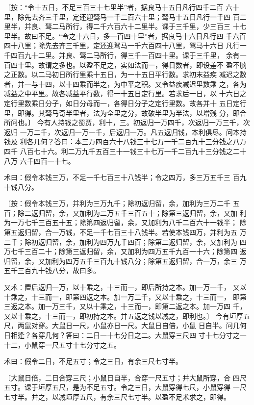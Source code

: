 \documentclass[a4paper,12pt,UTF8,twoside]{ctexbook}
\begin{document}
〔按：“令十五日，不足三百三十七里半”者，据良马十五日凡行四千二百 六十里，除先去齐三千里，定还迎驽马一千二百六十里；驽马十五日凡行一千四 百二里半，并良、驽二马所行，得二千六百六十二里半。课于三千里，少三百三 十七里半。故曰不足。“令之十六日，多一百四十里”者，据良马十六日凡行四 千六百四十八里；除先去齐三千里，定还迎驽马一千六百四十八里，驽马十六日 凡行一千四百九十二里。并良、驽二马所行，得三千一百四十里。课于三千里， 余有一百四十里。故谓之多也。以盈不足之，实如法而一，得日数者，即设差不 盈不朒之正数。以二马初日所行里乘十五日，为一十五日平行数。求初末益疾 减迟之数者，并一与十四，以十四乘而半之，为中平之积。又令益疾减迟里数乘 之，各为减益之中平里。故各减益平行数，得一十五日定行里。若求后一日，以 十六日之定行里数乘日分子，如日分母而一，各得日分子之定行里数。故各并十 五日定行里，即得。其驽马奇半里者，法为全里之分，故破半里为半法，以增残 分，即合所问也。〕 今有人持钱之蜀贾，利十，三。初返归一万四千，次返归一万三千，次返归 一万二千，次返归一万一千，后返归一万。凡五返归钱，本利俱尽。问本持钱及 利各几何？答曰：本三万四百六十八钱三十七万一千二百九十三分钱之八万四千 八百七十六。利二万九千五百三十一钱三十七万一千二百九十三分钱之二十八万 六千四百一十七。

术曰：假令本钱三万，不足一千七百三十八钱半；令之四万，多三万五千三 百九十钱八分。

〔按：假令本钱三万，并利为三万九千；除初返归留，余，加利为三万二千 五百；除二返归留，余，又加利为二万五千三百五十；除第三返归留，余，又加 利为一万七千三百五十五；除第四返归留，余，又加利为八千二百六十一钱半； 除第五返归留，合一万钱，不足一千七百三十八钱半。若使本钱四万，并利为五 万二千；除初返归留，余，加利为四万九千四百；除第二返归留，余，又加利为 四万七千三百二十；除第三返归留，余，又加利为四万五千九百一十六；除第四 返归留，余，又加利为四万五千三百九十钱八分；除第五返归留，合一万，余三 万五千三百九十钱八分，故曰多。

又术：置后返归一万，以十乘之，十三而一，即后所持之本。加一万一千， 又以十乘之，十三而一，即第四返之本。加一万二千，又以十乘之，十三而一， 即第三返之本。加一万三千，又以十乘之，十三而一，即第二返之本。加一万四 千，又以十乘之，十三而一，即初持之本。并五返之钱以减之，即利也。〕 今有垣厚五尺，两鼠对穿。大鼠日一尺，小鼠亦日一尺。大鼠日自倍，小鼠 日自半。问几何日相逢？各穿几何？答曰：二日一十七分日之二。大鼠穿三尺四 寸十七分寸之一十二，小鼠穿一尺五寸十七分寸之五。

术曰：假令二日，不足五寸；令之三日，有余三尺七寸半。

〔大鼠日倍，二日合穿三尺；小鼠日自半，合穿一尺五寸；并大鼠所穿，合 四尺五寸。课于垣厚五尺，是为不足五寸。令之三日，大鼠穿得七尺，小鼠穿得 一尺七寸半。并之，以减垣厚五尺，有余三尺七寸半。以盈不足术求之，即得。
\end{document}
